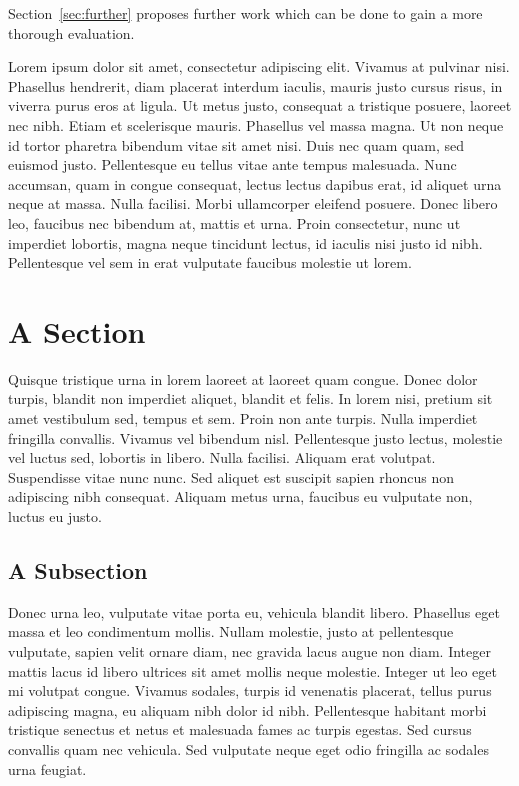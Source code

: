 
Section~\ref{sec:further} proposes further work which can be done to gain a more thorough evaluation.





Lorem ipsum dolor sit amet, consectetur adipiscing elit. Vivamus at pulvinar nisi. Phasellus hendrerit, diam placerat interdum iaculis, mauris justo cursus risus, in viverra purus eros at ligula. Ut metus justo, consequat a tristique posuere, laoreet nec nibh. Etiam et scelerisque mauris. Phasellus vel massa magna. Ut non neque id tortor pharetra bibendum vitae sit amet nisi. Duis nec quam quam, sed euismod justo. Pellentesque eu tellus vitae ante tempus malesuada. Nunc accumsan, quam in congue consequat, lectus lectus dapibus erat, id aliquet urna neque at massa. Nulla facilisi. Morbi ullamcorper eleifend posuere. Donec libero leo, faucibus nec bibendum at, mattis et urna. Proin consectetur, nunc ut imperdiet lobortis, magna neque tincidunt lectus, id iaculis nisi justo id nibh. Pellentesque vel sem in erat vulputate faucibus molestie ut lorem.

\section{A Section}

Quisque tristique urna in lorem laoreet at laoreet quam congue. Donec dolor turpis, blandit non imperdiet aliquet, blandit et felis. In lorem nisi, pretium sit amet vestibulum sed, tempus et sem. Proin non ante turpis. Nulla imperdiet fringilla convallis. Vivamus vel bibendum nisl. Pellentesque justo lectus, molestie vel luctus sed, lobortis in libero. Nulla facilisi. Aliquam erat volutpat. Suspendisse vitae nunc nunc. Sed aliquet est suscipit sapien rhoncus non adipiscing nibh consequat. Aliquam metus urna, faucibus eu vulputate non, luctus eu justo.

\subsection{A Subsection}

Donec urna leo, vulputate vitae porta eu, vehicula blandit libero. Phasellus eget massa et leo condimentum mollis. Nullam molestie, justo at pellentesque vulputate, sapien velit ornare diam, nec gravida lacus augue non diam. Integer mattis lacus id libero ultrices sit amet mollis neque molestie. Integer ut leo eget mi volutpat congue. Vivamus sodales, turpis id venenatis placerat, tellus purus adipiscing magna, eu aliquam nibh dolor id nibh. Pellentesque habitant morbi tristique senectus et netus et malesuada fames ac turpis egestas. Sed cursus convallis quam nec vehicula. Sed vulputate neque eget odio fringilla ac sodales urna feugiat.

